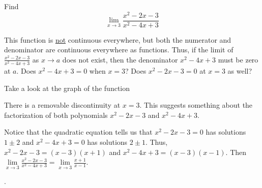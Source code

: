 \documentclass{ximera}
\begin{document}
\begin{question}
  Find 
  \[
  \displaystyle \lim_{x\to3} \frac{x^2-2x-3}{x^2-4x+3}
  \]
  \begin{solution}
    \begin{hint}
      This function is \underline{not} continuous everywhere, but both the numerator and denominator are continuous everywhere as functions. Thus, if the limit of $\frac{x^2-2x-3}{x^2-4x+3}$ as $x\to{a}$ does not exist, then the denominator $x^2-4x+3$ must be zero at $a$. Does $x^2-4x+3=0$ when $x=3$? Does $x^2-2x-3=0$ at $x=3$ as well?
    \end{hint}
     \begin{hint}
    Take a look at the graph of the function
    \begin{center}
      \end{center}
      There is a removable discontinuity at $x=3$. This suggests something about the factorization of both polynomials $x^2-2x-3$ and $x^2-4x+3$.
    \end{hint}
    \begin{hint}
     Notice that the quadratic equation tells us that $x^2-2x-3=0$ has solutions $1\pm2$ and $x^2-4x+3=0$ has solutions $2\pm{1}$. Thus, $x^2-2x-3=\left(x-3\right)\left(x+1\right)$ and $x^2-4x+3=\left(x-3\right)\left(x-1\right)$. Then $\lim\limits_{x\to3}\frac{x^2-2x-3}{x^2-4x+3}=\lim\limits_{x\to3}\frac{x+1}{x-1}$. 
    \end{hint}
    .
  \end{solution}
\end{question}
\end{document}
